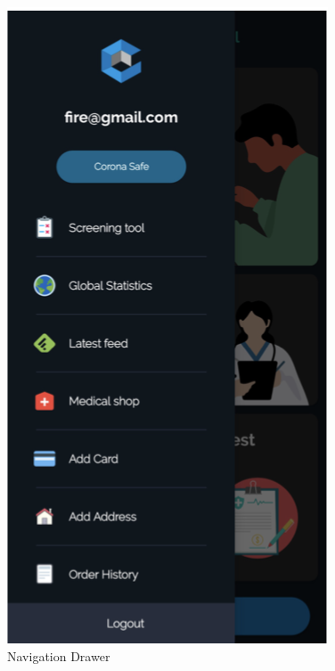\begin{center}
\includegraphics[scale=0.55]{navigation.png}\\[0.75cm]
\caption{Navigation Drawer}
\end{center}
